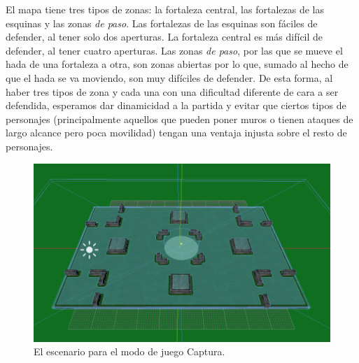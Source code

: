 \vspace{\baselineskip}

El mapa tiene tres tipos de zonas: la fortaleza central, las fortalezas de las esquinas y las zonas \emph{de paso}. Las fortalezas de las esquinas son fáciles de defender, al tener solo dos aperturas. La fortaleza central es más difícil de defender, al tener cuatro aperturas. Las zonas \emph{de paso}, por las que se mueve el hada de una fortaleza a otra, son zonas abiertas por lo que, sumado al hecho de que el hada se va moviendo, son muy difíciles de defender. De esta forma, al haber tres tipos de zona y cada una con una dificultad diferente de cara a ser defendida, esperamos dar dinamicidad a la partida y evitar que ciertos tipos de personajes (principalmente aquellos que pueden poner muros o tienen ataques de largo alcance pero poca movilidad) tengan una ventaja injusta sobre el resto de personajes.

\begin{figure}[h]
	\centering
	\includegraphics[width=0.8\linewidth]{figures/CaptureStage.png}
	\caption{El escenario para el modo de juego Captura.}
	\label{fig:CaptureStage}
\end{figure}